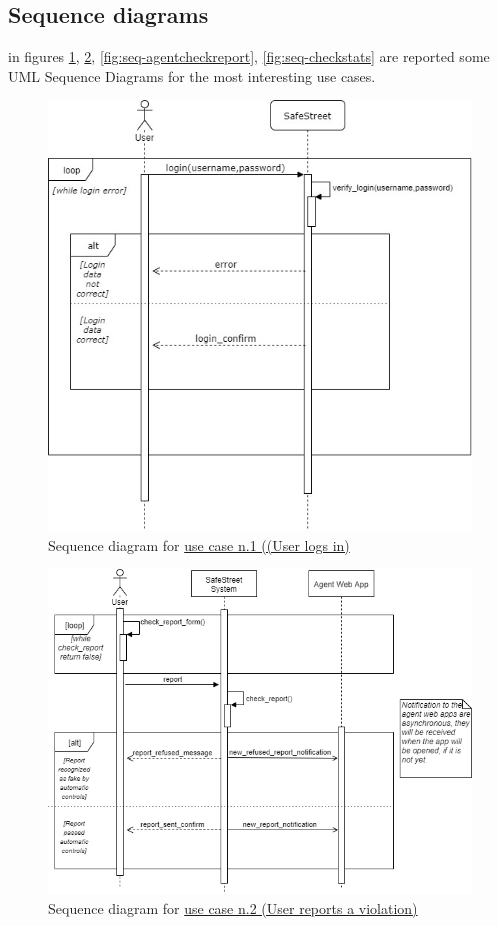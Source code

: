\documentclass[a4paper]{report}
\begin{document}
\subsection{Sequence diagrams}
in figures \ref{fig:seq-userlogin}, \ref{fig:seq-userreport}, \ref{fig:seq-agentcheckreport}, \ref{fig:seq-checkstats} are reported some UML Sequence Diagrams for the most interesting use cases. \\
\begin{figure}[htp]
\includegraphics[width=\textwidth]{SequenceUserLogin}
\caption{Sequence diagram for \hyperref[uc:1]{use case n.1 ((User logs in)} }
\label{fig:seq-userlogin}
\end{figure}

\begin{figure}[htp]
\includegraphics[width=\textwidth]{SequenceSendReport}
\caption{Sequence diagram for \hyperref[uc:2]{use case n.2 (User reports a violation)} }
\label{fig:seq-userreport}
\end{figure}
\end{document}
